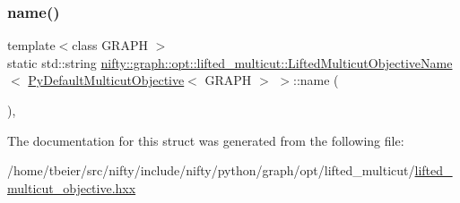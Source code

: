 \subsubsection{\texorpdfstring{name()}{name()}}
{\footnotesize\ttfamily template$<$class G\+R\+A\+PH $>$ \\
static std\+::string \hyperlink{structnifty_1_1graph_1_1opt_1_1lifted__multicut_1_1LiftedMulticutObjectiveName}{nifty\+::graph\+::opt\+::lifted\+\_\+multicut\+::\+Lifted\+Multicut\+Objective\+Name}$<$ \hyperlink{namespacenifty_1_1graph_1_1opt_1_1lifted__multicut_a50eb6f4cbd7b34af026c6031669b85cb}{Py\+Default\+Multicut\+Objective}$<$ G\+R\+A\+PH $>$ $>$\+::name (\begin{DoxyParamCaption}{ }\end{DoxyParamCaption})\hspace{0.3cm}{\ttfamily [inline]}, {\ttfamily [static]}}



The documentation for this struct was generated from the following file\+:\begin{DoxyCompactItemize}
\item 
/home/tbeier/src/nifty/include/nifty/python/graph/opt/lifted\+\_\+multicut/\hyperlink{python_2graph_2opt_2lifted__multicut_2lifted__multicut__objective_8hxx}{lifted\+\_\+multicut\+\_\+objective.\+hxx}\end{DoxyCompactItemize}
